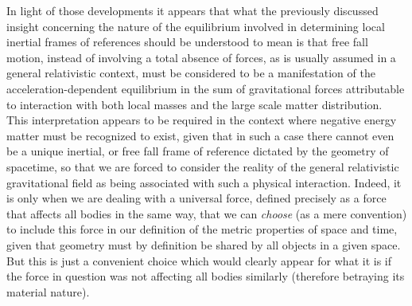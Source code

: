 \documentclass[notitlepage,12pt]{report}
\begin{document}
In light of those developments it appears that what the previously discussed insight concerning the nature of the equilibrium involved in determining local inertial frames of references should be understood to mean is that free fall motion, instead of involving a total absence of forces, as is usually assumed in a general relativistic context, must be considered to be a manifestation of the acceleration-dependent equilibrium in the sum of gravitational forces attributable to interaction with both local masses and the large scale matter distribution. This interpretation appears to be required in the context where negative energy matter must be recognized to exist, given that in such a case there cannot even be a unique inertial, or free fall frame of reference dictated by the geometry of spacetime, so that we are forced to consider the reality of the general relativistic gravitational field as being associated with such a physical interaction. Indeed, it is only when we are dealing with a universal force, defined precisely as a force that affects all bodies in the same way, that we can \textit{choose} (as a mere convention) to include this force in our definition of the metric properties of space and time, given that geometry must by definition be shared by all objects in a given space. But this is just a convenient choice which would clearly appear for what it is if the force in question was not affecting all bodies similarly (therefore betraying its material nature).
\end{document}
